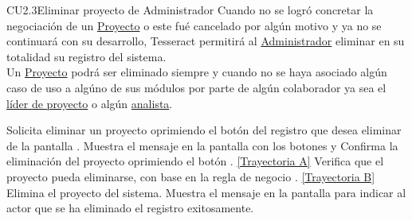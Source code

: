 	\begin{UseCase}{CU2.3}{Eliminar proyecto de Administrador}{
			Cuando no se logró concretar la negociación de un \hyperlink{proyectoEntidad}{Proyecto} o este fué cancelado por algún motivo y ya no se continuará con su desarrollo, Tesseract permitirá al {\hyperlink{admin}{Administrador}} eliminar en su totalidad su registro del sistema. \\
			Un \hyperlink{proyectoEntidad}{Proyecto} podrá ser eliminado siempre y cuando no se haya asociado algún caso de uso a algúno de sus módulos por parte de algún colaborador ya sea el {\hyperlink{jefe}{líder de proyecto}} o algún {\hyperlink{analista}{analista}}.
	}
	\end{UseCase}
	\begin{UCtrayectoria}
		\UCpaso[\UCactor] Solicita eliminar un proyecto oprimiendo el botón \eliminar del registro que desea eliminar de la pantalla .
		\UCpaso[\UCsist] Muestra el mensaje  en la pantalla  con los botones  y 
		\UCpaso[\UCsist] Confirma la eliminación del proyecto oprimiendo el botón . \hyperlink{CU2-3:TAA}{[Trayectoria A]}
		\UCpaso[\UCsist] Verifica que el proyecto pueda eliminarse, con base en la regla de negocio . \hyperlink{CU2-3:TAB}{[Trayectoria B]}
		\UCpaso[\UCsist] Elimina el proyecto del sistema.
		\UCpaso[\UCsist] Muestra el mensaje  en la pantalla  para indicar al actor que se ha eliminado el registro exitosamente.
	\end{UCtrayectoria}		
